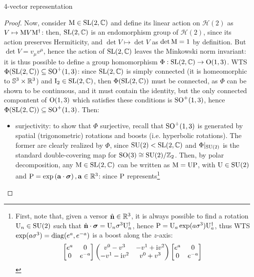 \begin{observation}{4-vector representation}{}
\begin{proofbox}
\begin{proof}
    Now, consider $ \mathrm{M} \in \mathrm{SL}(2,\mathbb{C}) $ and define its linear action on $ \mathcal{H}(2) $ as $ V \mapsto \mathrm{M} V \mathrm{M}^\dagger $: then, $ \mathrm{SL}(2,\mathbb{C}) $ is an endomorphism group of $ \mathcal{H}(2) $, since its action preserves Hermiticity, and $ \det V \mapsto \det V $ as $ \det \mathrm{M} = 1 $ by definition. But $ \det V = v_\mu v^\mu $, hence the action of $ \mathrm{SL}(2,\mathbb{C}) $ leaves the Minkowski norm invariant: it is thus possible to define a group homomorphism $ \Phi : \mathrm{SL}(2,\mathbb{C}) \rightarrow \mathrm{O}(1,3) $. WTS $ \Phi(\mathrm{SL}(2,\mathbb{C})) \subseteq \mathrm{SO}^+(1,3) $: since $ \mathrm{SL}(2,\mathbb{C}) $ is simply connected (it is homeomorphic to $ \mathbb{S}^{3} \times \mathbb{R}^3 $) and $ \mathrm{I}_2 \in \mathrm{SL}(2,\mathbb{C}) $, then $ \Phi(\mathrm{SL}(2,\mathbb{C})) $ must be connected, as $ \Phi $ can be shown to be continuous, and it must contain the identity, but the only connected compontent of $ \mathrm{O}(1,3) $ which satisfies these conditions is $ \mathrm{SO}^+(1,3) $, hence $ \Phi(\mathrm{SL}(2,\mathbb{C})) \subseteq \mathrm{SO}^+(1,3) $. Then:
    \begin{itemize}
      \item surjectivity: to show that $ \Phi $ surjective, recall that $ \mathrm{SO}^+(1,3) $ is generated by spatial (trigonometric) rotations and boosts (i.e. hyperbolic rotations). The former are clearly realized by $ \Phi $, since $ \mathrm{SU}(2) < \mathrm{SL}(2,\mathbb{C}) $ and $ \Phi \vert_{\mathrm{SU}(2)} $ is the standard double-covering map for $ \mathrm{SO}(3) \cong \mathrm{SU}(2) / \mathbb{Z}_2 $. Then, by polar decomposition, any $ \mathrm{M} \in \mathrm{SL}(2,\mathbb{C}) $ can be written as $ \mathrm{M} = \mathrm{U} \mathrm{P} $, with $ \mathrm{U} \in \mathrm{SU}(2) $ and $ \mathrm{P} = \exp \left( \mathbf{a} \cdot \boldsymbol{\sigma} \right) , \mathbf{a} \in \mathbb{R}^3 $: since $ \mathrm{P} $ represents\footnote{
          First, note that, given a versor $ \hat{\mathbf{n}} \in \mathbb{R}^3 $, it is always possible to find a rotation $ \mathrm{U}_n \in \mathrm{SU}(2) $ such that $ \hat{\mathbf{n}} \cdot \boldsymbol{\sigma} = \mathrm{U}_n \sigma^3 \mathrm{U}_n^\dagger $, hence $ \mathrm{P} = \mathrm{U}_a \exp (a \sigma^3) \mathrm{U}_a^\dagger $, thus WTS $ \exp (a \sigma^3) = \operatorname{diag} (e^a , e^{-a}) $ is a boost along the $ z $-axis:
          \begin{equation*}
            \begin{bmatrix}
              e^a & 0 \\ 0 & e^{-a}
            \end{bmatrix}
            \begin{pmatrix}
              v^0 - v^3 & - v^1 + \mathrm{i} v^2 \\
              - v^1 - \mathrm{i} v^2 & v^0 + v^3
            \end{pmatrix}
            \begin{bmatrix}
              e^a & 0 \\ 0 & e^{-a}

\end{bmatrix}
\end{equation*}}
\end{itemize}
\end{proof}
\end{proofbox}
\end{observation}
